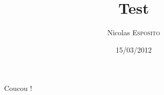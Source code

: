 \documentclass[a4paper]{article}
\begin{document}
\title{Test}
\author{Nicolas \textsc{Esposito}}
\date{15/03/2012}
\maketitle
\thispagestyle{empty}

Coucou !
\end{document}
